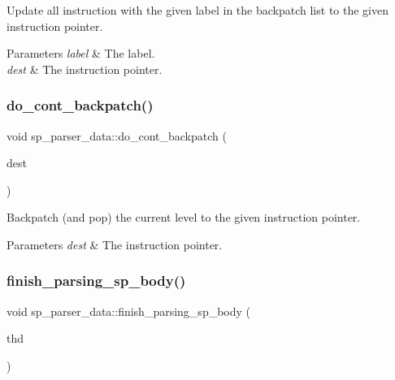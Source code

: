 Update all instruction with the given label in the backpatch list to the given instruction pointer.


\begin{DoxyParams}{Parameters}
{\em label} & The label. \\
\hline
{\em dest} & The instruction pointer. \\
\hline
\end{DoxyParams}
\mbox{\label{classsp__parser__data_a5c7d82d576eae213a1613809a47910d5}} 
\subsubsection{\texorpdfstring{do\+\_\+cont\+\_\+backpatch()}{do\_cont\_backpatch()}}
{\footnotesize\ttfamily void sp\+\_\+parser\+\_\+data\+::do\+\_\+cont\+\_\+backpatch (\begin{DoxyParamCaption}\item[{uint}]{dest }\end{DoxyParamCaption})}

Backpatch (and pop) the current level to the given instruction pointer.


\begin{DoxyParams}{Parameters}
{\em dest} & The instruction pointer. \\
\hline
\end{DoxyParams}
\mbox{\label{classsp__parser__data_af738f001cac1cf6ae2df63556a71184d}} 
\subsubsection{\texorpdfstring{finish\+\_\+parsing\+\_\+sp\+\_\+body()}{finish\_parsing\_sp\_body()}}
{\footnotesize\ttfamily void sp\+\_\+parser\+\_\+data\+::finish\+\_\+parsing\+\_\+sp\+\_\+body (\begin{DoxyParamCaption}\item[{T\+HD $\ast$}]{thd }\end{DoxyParamCaption})\hspace{0.3cm}{\ttfamily [inline]}}

